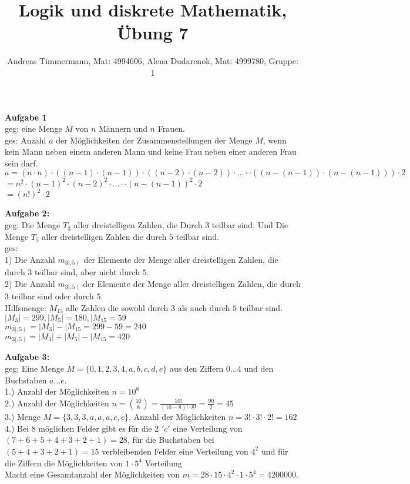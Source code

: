 \documentclass[a4paper]{scrartcl}
\title{Logik und diskrete Mathematik, Übung 7}
\author{Andreas Timmermann, Mat: 4994606, Alena Dudarenok, Mat: 4999780, Gruppe: 1}
\begin{document}
	\maketitle
	\begin{flushleft}
		\textbf{Aufgabe 1}\\
		geg: eine Menge $M$ von $n$ Männern und $n$ Frauen.\\
		ges: Anzahl $a$ der Möglichkeiten der Zusammenstellungen der Menge $M$, wenn kein Mann neben einem anderen Mann und keine Frau neben einer anderen Frau sein darf.\\[1em]
		
		$a = (n\cdot n)\cdot((n-1)\cdot (n-1))\cdot((n-2)\cdot (n-2))\cdot \dots\cdot\cdot((n-(n-1))\cdot (n-(n-1)))\cdot 2$\\
		$= n^2\cdot(n-1)^2\cdot(n-2)^2\cdot \dots\cdot\cdot(n-(n-1))^2\cdot 2$\\
		$=(n!)^2\cdot 2$\\
	\end{flushleft}
	\begin{flushleft}
		\textbf{Aufgabe 2:}\\
		geg: Die Menge $T_3$ aller dreistelligen Zahlen, die Durch $3$ teilbar sind. Und Die Menge $T_5$ aller dreistelligen Zahlen die durch $5$ teilbar sind.\\
		ges:\\
		1) Die Anzahl $m_{3\mid,5\nmid}$ der Elemente der Menge aller dreistelligen Zahlen, die durch $3$ teilbar sind, aber nicht durch $5$.\\
		2) Die Anzahl $m_{3\mid,5\mid}$ der Elemente der Menge aller dreistelligen Zahlen, die durch $3$ teilbar sind oder durch $5$.\\[1em]
		Hilfsmenge: $M_{15}$ alle Zahlen die sowohl durch $3$ als auch durch $5$ teilbar sind.\\
		$|M_3|=299, |M_5| = 180, |M_{15} = 59$\\
		$m_{3\mid,5\nmid}=|M_3|-|M_{15} = 299-59=240$\\
		$m_{3\mid,5\mid}=|M_3|+|M_5|-|M_{15}=420$\\[1em]
	\end{flushleft}
	\begin{flushleft}
		\textbf{Aufgabe 3:}\\	
		geg: Eine Menge $M=\{0,1,2,3,4,a,b,c,d,e\}$ aus den Ziffern $0\dots4$ und den Buchstaben $a\dots e$.\\[1em]
		1.) Anzahl der Möglichkeiten $n= 10^8$\\
		2.) Anzahl der Möglichkeiten $n= \binom{10}{8}=\frac{10!}{(10-8)!\cdot 8!}=\frac{90}{2}=45$\\
		3.) Menge $M=\{3,3,3,a,a,a,c,c\}$. Anzahl der Möglichkeiten $n= 3!\cdot 3!\cdot 2!= 162$\\
		4.) Bei $8$ möglichen Felder gibt es für die 2 $'c'$ eine Verteilung von $(7+6+5+4+3+2+1)=28$, für die Buchstaben bei $(5+4+3+2+1)=15$ verbleibenden Felder eine Verteilung von $4^2$ und für die Ziffern die Möglichkeiten von $1\cdot 5^4$ Verteilung\\
		Macht eine Gesamtanzahl der Möglichkeiten von $m=28\cdot 15\cdot 4^2\cdot 1\cdot 5^4=4200000$.\\[1em]
	\end{flushleft}
\end{document}
